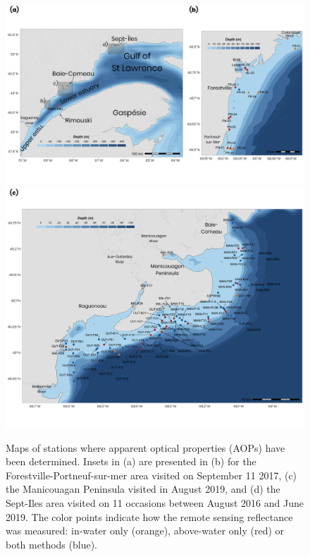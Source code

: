 \documentclass[essd, manuscript]{copernicus}
\begin{document}
\begin{figure}[!ht]
\includegraphics[width=12cm]{Figures/Fig1a-b.png}
\includegraphics[width=12cm]{Figures/Fig1c.png}
\caption{Maps of stations where apparent optical properties (AOPs) have been determined. Insets in (a) are presented in (b) for the Forestville-Portneuf-sur-mer area visited on September 11 2017, (c) the Manicouagan Peninsula visited in August 2019, and (d) the Sept-Iles area visited on 11 occasions between August 2016 and June 2019. The color points indicate how the remote sensing reflectance was measured: in-water only (orange), above-water only (red) or both methods (blue).}
\label{fig:maps}
\end{figure}
\setcounter{figure}{0}
\end{document}
